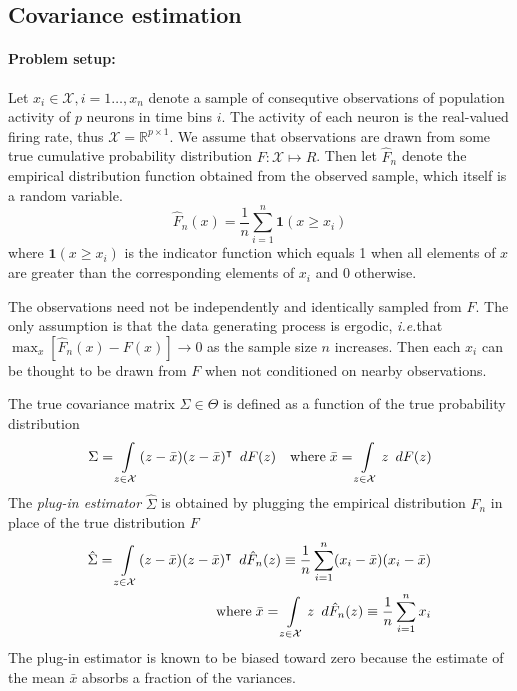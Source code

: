 \subsection{Covariance estimation}

\paragraph{Problem setup:}

Let $x_i \in \mathcal X, i=1\ldots,x_n$ denote a sample of consequtive observations of population activity of $p$ neurons in time bins $i$.  
The activity of each neuron is the real-valued firing rate, thus  $\mathcal X = \mathbb R^{p\times 1}$.  
We assume that observations are drawn from some true cumulative probability distribution $F: \mathcal X \mapsto R$. Then let $\hat F_n$ denote the empirical distribution function obtained from the observed sample, which itself is a random variable.
\begin{equation}
\hat F_n(x) = \frac 1 n \sum\limits_{i=1}^n \mathbf{1}(x \ge x_i)
\end{equation}
where $\mathbf 1(x \ge x_i)$ is the indicator function which equals 1 when all elements of $x$ are greater than the corresponding elements of $x_i$ and 0 otherwise.

The observations need not be independently and identically sampled from $F$. The only assumption is that the data generating process is ergodic, \emph{i.e.}\;that $\max_x \left[\hat F_n(x) - F(x)\right] \to 0$ as the sample size $n$ increases. Then each $x_i$ can be thought to be drawn from $F$ when not conditioned on nearby observations.

The true covariance matrix $\Sigma \in \Theta$ is defined as a function of the true probability distribution
\begin{equation}
\Sigma = \int\limits_{z\in\mathcal X} (z - \bar x)(z - \bar x)^\intercal \mathop{}\,d F(z)
\quad\mbox{where}\;
\bar x = \int\limits_{z\in\mathcal X} z \mathop{}\,d F(z)
\end{equation}
The \emph{plug-in estimator} $\hat\Sigma$ is obtained by plugging the empirical distribution $F_n$ in place of the true distribution $F$
\begin{equation}
\begin{split}
\hat\Sigma = \int\limits_{z\in\mathcal X} (z - \bar x)(z - \bar x)^\intercal \mathop{}\,d \hat F_n(z) 
\equiv \frac  1 n\sum\limits_{i=1}^n (x_i-\bar x)(x_i - \bar x)
\\
\mbox{where}\;\bar x = 
\int\limits_{z\in \mathcal X}z \mathop{}\,d \hat F_n(z) \equiv \frac 1 n\sum\limits_{i=1}^n x_i
\end{split}
\end{equation}
The plug-in estimator is known to be biased toward zero because the estimate of the mean $\bar x$ absorbs a fraction of the variances. 


